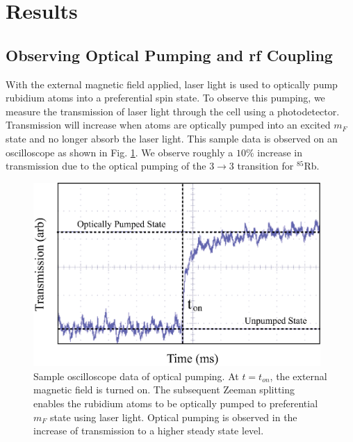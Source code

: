 

\section{Results}\label{results}

\subsection{Observing Optical Pumping and rf Coupling}\label{ObservingOpticalPumpingandrfCoupling}

With the external magnetic field applied, laser light is used to optically pump rubidium atoms into a preferential spin state.  To observe this pumping, we measure the transmission of laser light through the cell using a photodetector.  Transmission will increase when atoms are optically pumped into an excited $m_F$ state and no longer absorb the laser light. This sample data is observed on an oscilloscope as shown in Fig. \ref{fig:raw_data}.  We observe roughly a $10\%$ increase in transmission due to the optical pumping of the $3\rightarrow3$ transition for $^85$Rb.
\begin{figure}[htbp]
\begin{center}
\includegraphics[height=70mm]{./figures/raw_data.eps}
\caption{\small{Sample oscilloscope data of optical pumping. At $t=t_{on}$, the external magnetic field is turned on. The subsequent Zeeman splitting enables the rubidium atoms to be optically pumped to preferential $m_F$ state using laser light.  Optical pumping is observed in the increase of transmission to a higher steady state level.}}
\label{fig:raw_data}
\end{center}
\end{figure}

